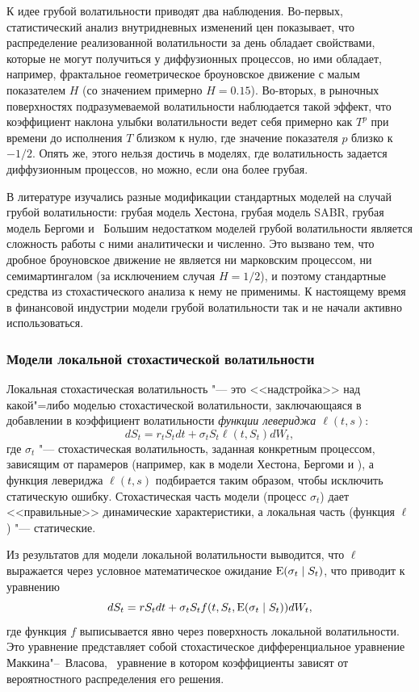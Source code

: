 К идее грубой волатильности приводят два наблюдения.
Во-первых, статистический анализ внутридневных изменений цен показывает, что распределение реализованной волатильности за день обладает свойствами, которые не могут получиться у диффузионных процессов, но ими обладает, например, фрактальное геометрическое броуновское движение с малым показателем $H$ (со значением примерно $H=0.15$).
Во-вторых, в рыночных поверхностях подразумеваемой волатильности наблюдается такой эффект, что коэффициент наклона улыбки волатильности ведет себя примерно как $T^p$ при времени до исполнения $T$ близком к нулю, где значение показателя $p$ близко к $-1/2$.
Опять же, этого нельзя достичь в моделях, где волатильность задается диффузионным процессов, но можно, если она более грубая.

В литературе изучались разные модификации стандартных моделей на случай грубой волатильности: грубая модель Хестона, грубая модель SABR, грубая модель Бергоми и \tp\ 
Большим недостатком моделей грубой волатильности является сложность работы с ними аналитически и численно.
Это вызвано тем, что дробное броуновское движение не является ни марковским процессом, ни семимартингалом (за исключением случая $H=1/2$), и поэтому стандартные средства из стохастического анализа к нему не применимы.
К настоящему время в финансовой индустрии модели грубой волатильности так и не начали активно использоваться.


\subsubsection{Модели локальной стохастической волатильности}

Локальная стохастическая волатильность "--- это <<надстройка>> над какой"=либо моделью стохастической волатильности, заключающаяся в добавлении в коэффициент волатильности\emph{ функции левериджа $\ell(t,s)$}:
\[
d S_t = r_tS_t dt + \sigma_tS_t\ell(t,S_t) dW_t,
\]
где $\sigma_t$ "--- стохастическая волатильность, заданная конкретным процессом, зависящим от парамеров (например, как в модели Хестона, Бергоми и \tp), а функция левериджа $\ell(t,s)$ подбирается таким образом, чтобы исключить статическую ошибку.
Стохастическая часть модели (процесс $\sigma_t$) дает <<правильные>> динамические характеристики, а локальная часть (функция $\ell$) "--- статические.

Из результатов для модели локальной волатильности выводится, что $\ell$ выражается через условное математическое ожидание $\operatorname{E}(\sigma_t\mid S_t)$, что приводит к уравнению
\begin{equation}
\label{intro:lsv}
dS_t = rS_t dt + \sigma_t S_t f(t,S_t,\operatorname{E}(\sigma_t\mid S_t)) d W_t,
\end{equation}
где функция $f$ выписывается явно через поверхность локальной волатильности.
Это уравнение представляет собой стохастическое дифференциальное уравнение Маккина"--~Власова, \te\ уравнение в котором коэффициенты зависят от вероятностного распределения его решения.

